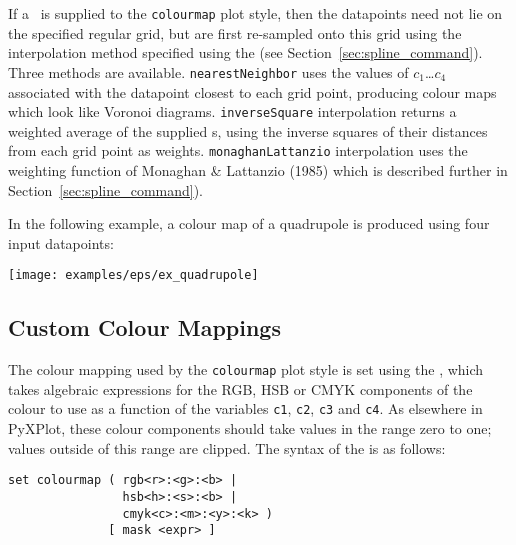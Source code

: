 If a \datafile\ is supplied to the {\tt colourmap} plot style, then the
datapoints need not lie on the specified regular grid, but are first re-sampled
onto this grid using the interpolation method specified using the  (see Section~\ref{sec:spline_command}). Three methods are
available. {\tt nearest\-Neigh\-bor} uses the values of $c_1$\ldots$c_4$
associated with the datapoint closest to each grid point, producing colour maps
which look like Voronoi diagrams. {\tt inverse\-Square} interpolation returns a
weighted average of the supplied \datapoint s, using the inverse squares of
their distances from each grid point as weights. {\tt monag\-han\-Lattan\-zio}
interpolation uses the weighting function of Monaghan \& Lattanzio (1985) which
is described further in Section~\ref{sec:spline_command}).

In the following example, a colour map of a quadrupole is produced using four
input datapoints:

\newline
{}\newline
{}\newline
{}\newline
{}\newline
{}\newline
{}\newline
{}\newline
{}

\centerline{\texttt{[image: examples/eps/ex\_quadrupole]}}

\subsection{Custom Colour Mappings}

The colour mapping used by the {\tt colourmap} plot style is set using the
, which takes algebraic expressions for the RGB, HSB or
CMYK components of the colour to use as a function of the variables {\tt c1},
{\tt c2}, {\tt c3} and {\tt c4}. As elsewhere in PyXPlot, these colour
components should take values in the range zero to one; values outside of this
range are clipped.  The syntax of the  is as follows:

\begin{verbatim}
set colourmap ( rgb<r>:<g>:<b> |
                hsb<h>:<s>:<b> |
                cmyk<c>:<m>:<y>:<k> )
              [ mask <expr> ]
\end{verbatim}

